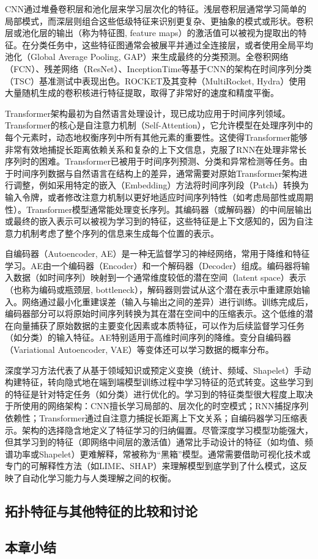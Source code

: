 CNN通过堆叠卷积层和池化层来学习层次化的特征。浅层卷积层通常学习简单的局部模式，而深层则组合这些低级特征来识别更复杂、更抽象的模式或形状。卷积层或池化层的输出（称为特征图, feature maps）的激活值可以被视为提取出的特征。在分类任务中，这些特征图通常会被展平并通过全连接层，或者使用全局平均池化（Global Average Pooling, GAP）来生成最终的分类预测。全卷积网络（FCN）、残差网络（ResNet）、InceptionTime等基于CNN的架构在时间序列分类（TSC）基准测试中表现出色。ROCKET及其变种（MultiRocket, Hydra）使用大量随机生成的卷积核进行特征提取，取得了非常好的速度和精度平衡。

Transformer架构最初为自然语言处理设计，现已成功应用于时间序列领域。Transformer的核心是自注意力机制（Self-Attention），它允许模型在处理序列中的每个元素时，动态地权衡序列中所有其他元素的重要性。这使得Transformer能够非常有效地捕捉长距离依赖关系和复杂的上下文信息，克服了RNN在处理非常长序列时的困难。Transformer已被用于时间序列预测、分类和异常检测等任务。由于时间序列数据与自然语言在结构上的差异，通常需要对原始Transformer架构进行调整，例如采用特定的嵌入（Embedding）方法将时间序列段（Patch）转换为输入令牌，或者修改注意力机制以更好地适应时间序列特性（如考虑局部性或周期性）。Transformer模型通常能处理变长序列。其编码器（或解码器）的中间层输出或最终的嵌入表示可以被视为学习到的特征，这些特征是上下文感知的，因为自注意力机制考虑了整个序列的信息来生成每个位置的表示。

自编码器（Autoencoder, AE）是一种无监督学习的神经网络，常用于降维和特征学习。AE由一个编码器（Encoder）和一个解码器（Decoder）组成。编码器将输入数据（如时间序列）映射到一个通常维度较低的潜在空间（latent space）表示（也称为编码或瓶颈层, bottleneck），解码器则尝试从这个潜在表示中重建原始输入。网络通过最小化重建误差（输入与输出之间的差异）进行训练。训练完成后，编码器部分可以将原始时间序列转换为其在潜在空间中的压缩表示。这个低维的潜在向量捕获了原始数据的主要变化因素或本质特征，可以作为后续监督学习任务（如分类）的输入特征。AE特别适用于高维时间序列的降维。变分自编码器（Variational Autoencoder, VAE）等变体还可以学习数据的概率分布。

深度学习方法代表了从基于领域知识或预定义变换（统计、频域、Shapelet）手动构建特征，转向隐式地在端到端模型训练过程中学习特征的范式转变。这些学习到的特征是针对特定任务（如分类）进行优化的。学习到的特征类型很大程度上取决于所使用的网络架构：CNN擅长学习局部的、层次化的时空模式；RNN捕捉序列依赖性；Transformer通过自注意力捕捉长距离上下文关系；自编码器学习压缩表示。架构的选择隐含地定义了特征学习的归纳偏置。尽管深度学习模型功能强大，但其学习到的特征（即网络中间层的激活值）通常比手动设计的特征（如均值、频谱功率或Shapelet）更难解释，常被称为“黑箱”模型。通常需要借助可视化技术或专门的可解释性方法（如LIME、SHAP）来理解模型到底学到了什么模式，这反映了自动化学习能力与人类理解之间的权衡。

\subsection{拓扑特征与其他特征的比较和讨论}

 \subsection{本章小结}
        \label{sec:ch4_summary}

